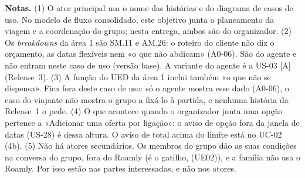 \documentclass[11pt,a4paper]{article}
\newcommand{\reg}[1]{{\footnotesize\textcolor{pendente}{(#1)}}}
\begin{document}
\medskip
{\footnotesize\textbf{Notas.}
(1) O ator principal usa o nome das histórias e do diagrama de casos de uso. No modelo de fluxo consolidado, este objetivo junta o planeamento da viagem e a coordenação do grupo; nesta entrega, ambos são do organizador.
(2) Os \textit{breakdowns} da área 1 são SM.11 e AM.26: o roteiro do cliente não diz o orçamento, as datas flexíveis nem «o que não abdicam» \reg{A0-06}. São do agente e não entram neste caso de uso (versão base). A variante do agente é a US-03 [A] (Release~3).
(3) A função do UED da área 1 inclui também «o que não se dispensa». Fica fora deste caso de uso: só o agente mostra esse dado \reg{A0-06}, o caso do viajante não mostra o grupo a fixá-lo à partida, e nenhuma história da Release~1 o pede.
(4) O que acontece quando o organizador junta uma opção pertence a «Adicionar uma oferta por ligação»: o aviso de opção fora da janela de datas (US-28) é dessa altura. O aviso de total acima do limite está no UC-02 (4b).
(5) Não há atores secundários. Os membros do grupo dão as suas condições na conversa do grupo, fora do Roamly (é o gatilho, \reg{UE02}), e a família não usa o Roamly. Por isso estão nas partes interessadas, e não nos atores.\par}
\end{document}
